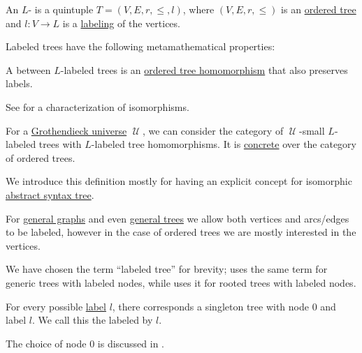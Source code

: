 \begin{definition}\label{def:labeled_tree}\mimprovised
  An \( L \)- is a quintuple \( T = (V, E, r, \leq, l) \), where \( (V, E, r, \leq) \) is an \hyperref[def:ordered_tree]{ordered tree} and \( l: V \to L \) is a \hyperref[def:labeled_set]{labeling} of the vertices.

  Labeled trees have the following metamathematical properties:
  \begin{thmenum}
     A  between \( L \)-labeled trees is an \hyperref[def:ordered_tree/homomorphism]{ordered tree homomorphism} that also preserves labels.

    See  for a characterization of isomorphisms.

     For a \hyperref[def:grothendieck_universe]{Grothendieck universe} \( \mscrU \), we can consider the category of \( \mscrU \)-small \( L \)-labeled trees with \( L \)-labeled tree homomorphisms. It is \hyperref[def:concrete_category]{concrete} over the category of ordered trees.
  \end{thmenum}
\end{definition}
\begin{comments}
  \item We introduce this definition mostly for having an explicit concept for isomorphic \hyperref[con:abstract_syntax_tree]{abstract syntax tree}.

  \item For \hyperref[rem:arbitrary_kind_graph]{general graphs} and even \hyperref[def:tree]{general trees} we allow both vertices and arcs/edges to be labeled, however in the case of ordered trees we are mostly interested in the vertices.

  We have chosen the term \enquote{labeled tree} for brevity;  uses the same term for generic trees with labeled nodes, while  uses it for rooted trees with labeled nodes.
\end{comments}

\begin{definition}\label{def:canonical_singleton_tree}\mimprovised
  For every possible \hyperref[def:labeled_set]{label} \( l \), there corresponds a singleton tree with node \( 0 \) and label \( l \). We call this the  labeled by \( l \).

  The choice of node \( 0 \) is discussed in .
\end{definition}

